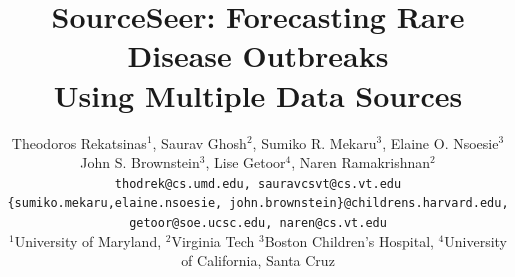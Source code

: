 \documentclass[twoside,leqno,twocolumn]{article}
\newcommand{\fullmodel}{{{\sf SourceSeer}}\xspace}
\begin{document}

\title{\fullmodel: Forecasting Rare Disease Outbreaks \\ Using Multiple Data Sources}
\date{}

\author {
Theodoros Rekatsinas$^1$, Saurav Ghosh$^2$, Sumiko R. Mekaru$^3$, Elaine O. Nsoesie$^3$ \\ 
John S. Brownstein$^3$, Lise Getoor$^4$, Naren Ramakrishnan$^2$ \\
{\small \texttt{thodrek@cs.umd.edu, sauravcsvt@cs.vt.edu}}\\ 
{\small \texttt{\{sumiko.mekaru,elaine.nsoesie, john.brownstein\}@childrens.harvard.edu,}} \\
{\small \texttt{getoor@soe.ucsc.edu, naren@cs.vt.edu}}\\ 
{\small $^1$University of Maryland, $^2$Virginia Tech}
{\small $^3$Boston Children's Hospital, $^4$University of California, Santa Cruz}
}
\end{document}
